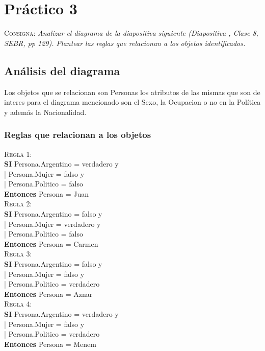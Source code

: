 \documentclass{article}
\begin{document}
\section{Práctico 3}
\textsc{Consigna}: \textit{Analizar el diagrama de la diapositiva siguiente
(Diapositiva , Clase 8, SEBR, pp 129). Plantear las reglas que relacionan a los
objetos identificados.}

\subsection{Análisis del diagrama}
Los objetos que se relacionan son Personas los atributos de las mismas que son
de interes para el diagrama mencionado son el Sexo, la Ocupacion o no en la
Política y además la Nacionalidad.

\subsubsection*{Reglas que relacionan a los objetos}
\textsc{Regla 1}: \\
\textbf{SI} Persona.Argentino = verdadero y \\
|    Persona.Mujer = falso y \\
|    Persona.Politico = falso \\
\textbf{Entonces} Persona = Juan\\

\textsc{Regla 2}: \\
\textbf{SI} Persona.Argentino = falso y \\
|    Persona.Mujer = verdadero y \\
|    Persona.Politico = falso \\
\textbf{Entonces} Persona = Carmen\\

\textsc{Regla 3}: \\
\textbf{SI} Persona.Argentino = falso y \\
|    Persona.Mujer = falso y \\
|    Persona.Politico = verdadero \\
\textbf{Entonces} Persona = Aznar\\

\textsc{Regla 4}: \\
\textbf{SI} Persona.Argentino = verdadero y \\
|    Persona.Mujer = falso y \\
|    Persona.Politico = verdadero \\
\textbf{Entonces} Persona = Menem\\
\end{document}
